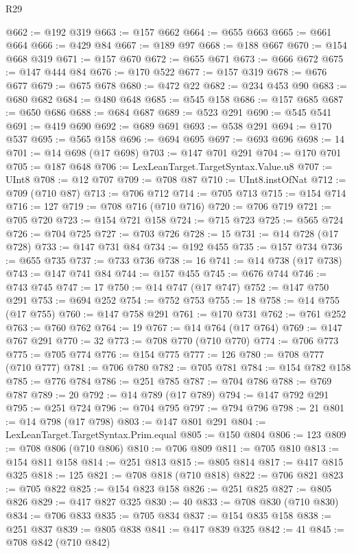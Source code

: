 \begin{lexlean}{R29}
\begin{coremodule}
@662 := @192 @319
@663 := @157 @662
@664 := @655 @663
@665 := @661 @664
@666 := @429 @84
@667 := @189 @97
@668 := @188 @667
@670 := @154 @668 @319
@671 := @157 @670
@672 := @655 @671
@673 := @666 @672
@675 := @147 @444 @84
@676 := @170 @522
@677 := @157 @319
@678 := @676 @677
@679 := @675 @678
@680 := @472 @22
@682 := @234 @453 @90
@683 := @680 @682
@684 := @480 @648
@685 := @545 @158
@686 := @157 @685
@687 := @650 @686
@688 := @684 @687
@689 := @523 @291
@690 := @545 @541
@691 := @419 @690
@692 := @689 @691
@693 := @538 @291
@694 := @170 @537
@695 := @565 @158
@696 := @694 @695
@697 := @693 @696
@698 := 14
@701 := @14 @698 (@17 @698)
@703 := @147 @701 @291
@704 := @170 @701
@705 := @187 @648
@706 := LexLeanTarget.TargetSyntax.Value.u8
@707 := UInt8
@708 := @12 @707
@709 := @708 @87
@710 := UInt8.instOfNat
@712 := @709 (@710 @87)
@713 := @706 @712
@714 := @705 @713
@715 := @154 @714
@716 := 127
@719 := @708 @716 (@710 @716)
@720 := @706 @719
@721 := @705 @720
@723 := @154 @721 @158
@724 := @715 @723
@725 := @565 @724
@726 := @704 @725
@727 := @703 @726
@728 := 15
@731 := @14 @728 (@17 @728)
@733 := @147 @731 @84
@734 := @192 @455
@735 := @157 @734
@736 := @655 @735
@737 := @733 @736
@738 := 16
@741 := @14 @738 (@17 @738)
@743 := @147 @741 @84
@744 := @157 @455
@745 := @676 @744
@746 := @743 @745
@747 := 17
@750 := @14 @747 (@17 @747)
@752 := @147 @750 @291
@753 := @694 @252
@754 := @752 @753
@755 := 18
@758 := @14 @755 (@17 @755)
@760 := @147 @758 @291
@761 := @170 @731
@762 := @761 @252
@763 := @760 @762
@764 := 19
@767 := @14 @764 (@17 @764)
@769 := @147 @767 @291
@770 := 32
@773 := @708 @770 (@710 @770)
@774 := @706 @773
@775 := @705 @774
@776 := @154 @775
@777 := 126
@780 := @708 @777 (@710 @777)
@781 := @706 @780
@782 := @705 @781
@784 := @154 @782 @158
@785 := @776 @784
@786 := @251 @785
@787 := @704 @786
@788 := @769 @787
@789 := 20
@792 := @14 @789 (@17 @789)
@794 := @147 @792 @291
@795 := @251 @724
@796 := @704 @795
@797 := @794 @796
@798 := 21
@801 := @14 @798 (@17 @798)
@803 := @147 @801 @291
@804 := LexLeanTarget.TargetSyntax.Prim.equal
@805 := @150 @804
@806 := 123
@809 := @708 @806 (@710 @806)
@810 := @706 @809
@811 := @705 @810
@813 := @154 @811 @158
@814 := @251 @813
@815 := @805 @814
@817 := @417 @815 @325
@818 := 125
@821 := @708 @818 (@710 @818)
@822 := @706 @821
@823 := @705 @822
@825 := @154 @823 @158
@826 := @251 @825
@827 := @805 @826
@829 := @417 @827 @325
@830 := 40
@833 := @708 @830 (@710 @830)
@834 := @706 @833
@835 := @705 @834
@837 := @154 @835 @158
@838 := @251 @837
@839 := @805 @838
@841 := @417 @839 @325
@842 := 41
@845 := @708 @842 (@710 @842)

\end{coremodule}
\end{lexlean}

